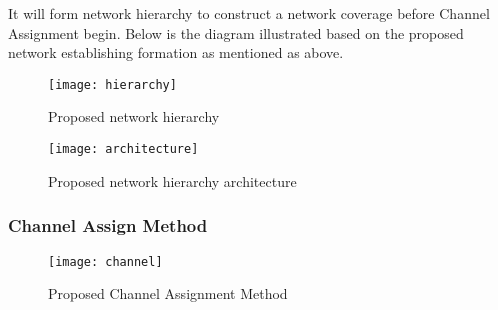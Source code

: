 \documentclass{article}
\begin{document}
It will form network hierarchy to construct a network coverage before Channel Assignment begin. Below is the diagram illustrated based on the proposed network establishing formation as mentioned as above.

\begin{center}
\begin{figure}
\texttt{[image: hierarchy]}
\caption{Proposed network hierarchy}
\end{figure}
\end{center}

\begin{center}
\begin{figure}
\texttt{[image: architecture]}
\caption{Proposed network hierarchy architecture}
\end{figure}
\end{center}

\newpage
\subsubsection{Channel Assign Method}

\begin{center}
\begin{figure}[h]
\texttt{[image: channel]}
\caption{Proposed Channel Assignment Method}\label{channel}
\end{figure}
\end{center}
\end{document}
